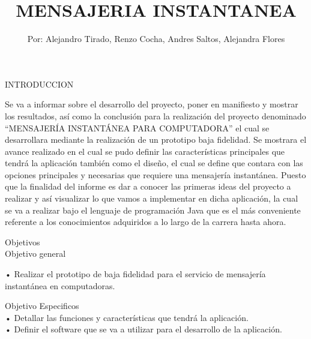 \documentclass[11pt,a4paper]{report}
\author{Por: Alejandro Tirado, Renzo Cocha, Andres Saltos, Alejandra Flores}
\title{MENSAJERIA INSTANTANEA}
\date{}
\begin{document}
\maketitle
\begin{center}
INTRODUCCION
\end{center}
Se va a informar sobre el desarrollo del proyecto, poner en manifiesto y mostrar los\vspace{0,5cm} resultados, así como la conclusión para la realización del proyecto denominado\vspace{0,5cm} “MENSAJERÍA INSTANTÁNEA PARA COMPUTADORA” el cual se desarrollara mediante la realización\vspace{0,5cm} de un prototipo baja fidelidad.
Se mostrara el avance realizado en el cual\vspace{0,5cm} se pudo definir las características principales que tendrá la aplicación también como el\vspace{0,5cm} diseño, el cual se define que contara con las opciones principales y necesarias que requiere\vspace{0,5cm} una mensajería instantánea.
Puesto que la finalidad del informe es dar a conocer las\vspace{0,5cm} primeras ideas del proyecto a realizar y así visualizar lo que vamos a implementar en dicha\vspace{0,5cm} aplicación, la cual se va a realizar bajo el lenguaje de programación Java que es el más\vspace{0,5cm} conveniente referente a los conocimientos adquiridos a lo largo de la carrera hasta ahora.\newpage

Objetivos\newline\\

Objetivo general\vspace{0,5cm}

• Realizar el prototipo de baja fidelidad para el servicio de mensajería instantánea en\vspace{0,5cm} computadoras.\vspace{0,5cm}

Objetivo Especificos\newline\\


•	Detallar  las funciones y características que tendrá la aplicación.\newline\\

•	Definir el software que se va a utilizar para el desarrollo de la aplicación.\newline\\
\end{document}
